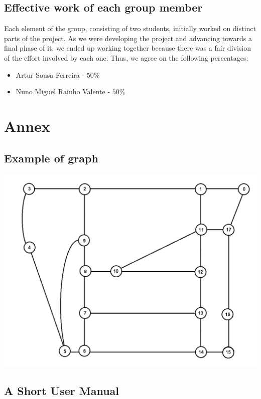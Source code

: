 \documentclass[a4paper]{article}
\begin{document}
\subsection{Effective work of each group member}

Each element of the group, consisting of two students, initially worked on distinct parts of the project. As we were developing the project and advancing towards a final phase of it, we ended up working together because there was a fair division of the effort involved by each one. Thus, we agree on the following percentages:

\begin{itemize}
	
	\item Artur Sousa Ferreira - $50\%$
	\item Nuno Miguel Rainho Valente - $50\%$
	
\end{itemize}

\newpage
\appendix

\section{Annex}\label{annex}
\subsection{Example of graph}\label{graph_ex}
\includegraphics[scale=0.75]{small_graph.png}


\subsection{A Short User Manual}
\end{document}
